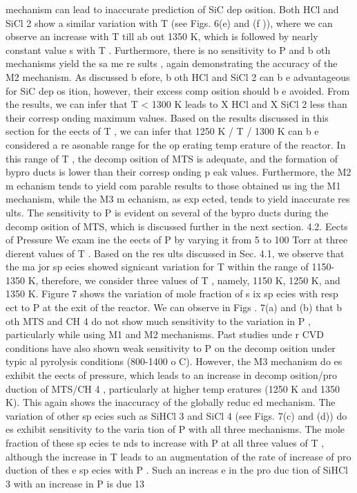 \documentclass[10pt, letterpaper]{article}
\begin{document}
mechanism can lead to inaccurate prediction of SiC dep osition.
Both HCl and SiCl
2
show a similar variation with
T
(see Figs. 6(e) and (f )), where we can observe an
increase with
T
till ab out 1350 K, which is followed by nearly constant value s with
T
. Furthermore, there
is no sensitivity to
P
and b oth mechanisms yield the sa me re sults , again demonstrating the accuracy of the
M2 mechanism. As discussed b efore, b oth HCl and SiCl
2
can b e advantageous for SiC dep os ition, however,
their excess comp osition should b e avoided. From the results, we can infer that
T <
1300 K leads to
X
HCl
and
X
SiCl
2
less than their corresp onding maximum values.
Based on the results discussed in this section for the eects of
T
, we can infer that 1250 K
/
T
/
1300 K
can b e considered a re asonable range for the op erating temp erature of the reactor. In this range of
T
, the
decomp osition of MTS is adequate, and the formation of bypro ducts is lower than their corresp onding p eak
values. Furthermore, the M2 m echanism tends to yield com parable results to those obtained us ing the M1
mechanism, while the M3 m echanism, as exp ected, tends to yield inaccurate res ults. The sensitivity to
P
is evident on several of the bypro ducts during the decomp osition of MTS, which is discussed further in the
next section.
4.2. Eects of Pressure
We exam ine the eects of
P
by varying it from 5 to 100 Torr at three dierent values of
T
. Based on
the res ults discussed in Sec. 4.1, we observe that the ma jor sp ecies showed signicant variation for
T
within
the range of 1150-1350 K, therefore, we consider three values of
T
, namely, 1150 K, 1250 K, and 1350 K.
Figure 7 shows the variation of mole fraction of s ix sp ecies with resp ect to
P
at the exit of the reactor.
We can observe in Figs . 7(a) and (b) that b oth MTS and CH
4
do not show much sensitivity to the variation
in
P
, particularly while using M1 and M2 mechanisms. Past studies unde r CVD conditions have also shown
weak sensitivity to
P
on the decomp osition under typic al pyrolysis conditions (800-1400
o
C). However, the
M3 mechanism do es exhibit the eects of pressure, which leads to an increase in decomp osition/pro duction
of MTS/CH
4
, particularly at higher temp eratures (1250 K and 1350 K). This again shows the inaccuracy of
the globally reduc ed mechanism.
The variation of other sp ecies such as SiHCl
3
and SiCl
4
(see Figs. 7(c) and (d)) do es exhibit sensitivity
to the varia tion of
P
with all three mechanisms. The mole fraction of these sp ecies te nds to increase with
P
at all three values of
T
, although the increase in
T
leads to an augmentation of the rate of increase of
pro duction of thes e sp ecies with
P
. Such an increas e in the pro duc tion of SiHCl
3
with an increase in
P
is due
13
\end{document}
